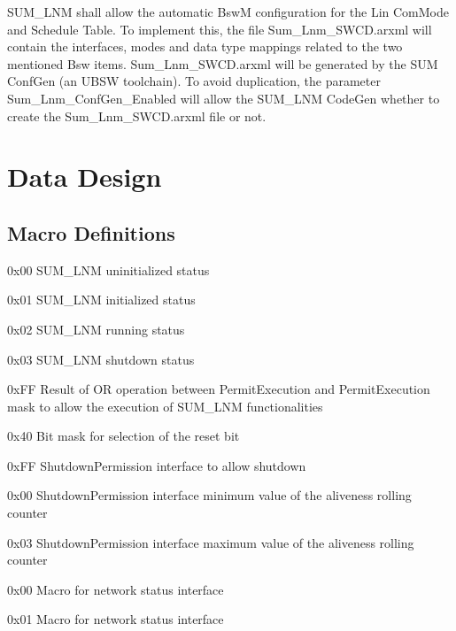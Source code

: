 {
SUM_LNM shall allow the automatic BswM configuration for the Lin ComMode and Schedule Table. To implement this, the file Sum_Lnm_SWCD.arxml will contain
the interfaces, modes and data type mappings related to the two mentioned Bsw items. Sum_Lnm_SWCD.arxml will be generated by the SUM ConfGen (an UBSW toolchain). 
To avoid duplication, the parameter Sum_Lnm_ConfGen_Enabled will allow the SUM_LNM CodeGen whether to create the Sum_Lnm_SWCD.arxml file or not.
}
{}


\section{Data Design}

\subsection{Macro Definitions}
\label{sec:macro}

{
{0x00}
{SUM_LNM uninitialized status}

{0x01}
{SUM_LNM initialized status}

{0x02}
{SUM_LNM running status}

{0x03}
{SUM_LNM shutdown status}
}
{}

{
{0xFF}
{Result of OR operation between PermitExecution and PermitExecution mask to allow the execution of SUM_LNM functionalities}

{0x40}
{Bit mask for selection of the reset bit}
}
{}

{
{0xFF}
{ShutdownPermission interface to allow shutdown}

{0x00}
{ShutdownPermission interface minimum value of the aliveness rolling counter}

{0x03}
{ShutdownPermission interface maximum value of the aliveness rolling counter}
}
{}

{
{0x00}
{Macro for network status interface}

{0x01}
{Macro for network status interface}
}
{  }

